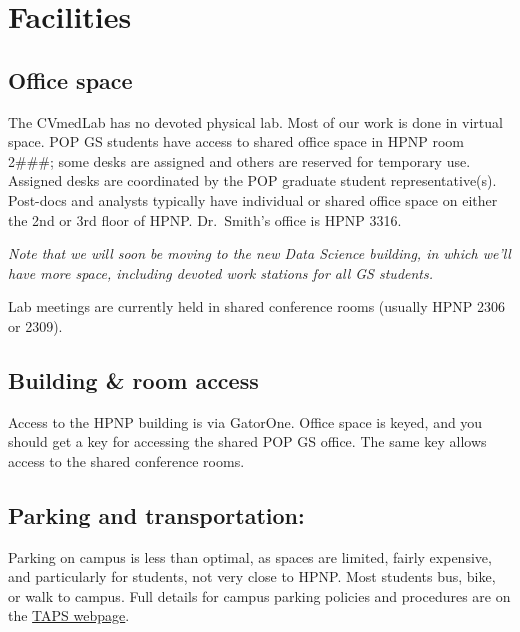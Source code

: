 \documentclass[
  letterpaper,
  DIV=11,
  numbers=noendperiod]{scrreprt}
\begin{document}
\hypertarget{facilities}{%
\section{Facilities}\label{facilities}}

\hypertarget{office-space}{%
\subsection{Office space}\label{office-space}}

The CVmedLab has no devoted physical lab. Most of our work is done in
virtual space. POP GS students have access to shared office space in
HPNP room 2\#\#\#; some desks are assigned and others are reserved for
temporary use. Assigned desks are coordinated by the POP graduate
student representative(s). Post-docs and analysts typically have
individual or shared office space on either the 2nd or 3rd floor of
HPNP. Dr.~Smith's office is HPNP 3316.

\emph{Note that we will soon be moving to the new Data Science building,
in which we'll have more space, including devoted work stations for all
GS students.}

Lab meetings are currently held in shared conference rooms (usually HPNP
2306 or 2309).

\hypertarget{building-room-access}{%
\subsection{Building \& room access}\label{building-room-access}}

Access to the HPNP building is via GatorOne. Office space is keyed, and
you should get a key for accessing the shared POP GS office. The same
key allows access to the shared conference rooms.

\hypertarget{parking-and-transportation}{%
\subsection{Parking and
transportation:}\label{parking-and-transportation}}

Parking on campus is less than optimal, as spaces are limited, fairly
expensive, and particularly for students, not very close to HPNP. Most
students bus, bike, or walk to campus. Full details for campus parking
policies and procedures are on the \href{https://taps.ufl.edu/}{TAPS
webpage}.

\end{document}
